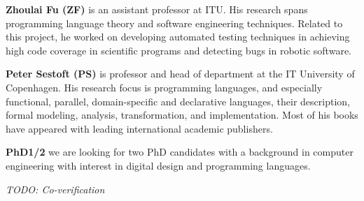 \documentclass[fleqn,12pt]{article}
\newcommand{\todo}[1]{{\it TODO: #1}}
\begin{document}
{\bf Zhoulai Fu (ZF)} is an assistant professor at ITU. His research
spans programming language theory and software engineering
techniques. Related to this project, he worked on developing automated
testing techniques in achieving high code coverage in scientific
programs and detecting bugs in robotic software.

{\bf Peter Sestoft (PS)} is professor and head of department at the IT University of Copenhagen.
His research focus is programming languages, and especially functional, parallel, domain-specific
and declarative languages, their description, formal modeling, analysis, transformation, and implementation.
Most of his books have appeared with leading international academic publishers.

{\bf PhD1/2} we are looking for two PhD candidates with a background in computer engineering
with interest in digital design and programming languages.

%

\todo{Co-verification}
\end{document}
